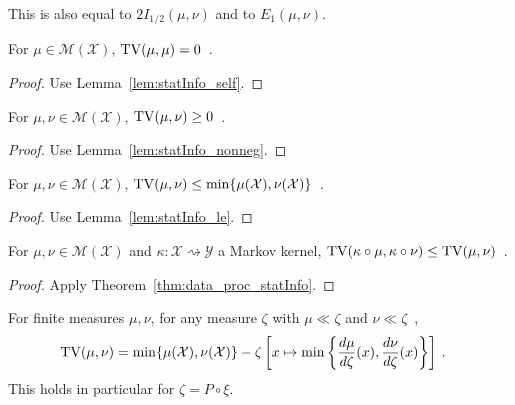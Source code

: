 This is also equal to $2 I_{1/2}(\mu, \nu)$ and to $E_1(\mu, \nu)$.

\begin{lemma}
  \label{lem:tv_self}
  For $\mu \in \mathcal M(\mathcal X)$, $\operatorname{TV}(\mu, \mu) = 0$~.
\end{lemma}

\begin{proof}%
{}
Use Lemma~\ref{lem:statInfo_self}.
\end{proof}

\begin{lemma}
  \label{lem:tv_nonneg}
  For $\mu, \nu \in \mathcal M(\mathcal X)$, $\operatorname{TV}(\mu, \nu) \ge 0$~.
\end{lemma}

\begin{proof}%
{}
Use Lemma~\ref{lem:statInfo_nonneg}.
\end{proof}


\begin{lemma}
  \label{lem:tv_le}
  For $\mu, \nu \in \mathcal M(\mathcal X)$, $\operatorname{TV}(\mu, \nu) \le \min\{\mu(\mathcal X), \nu(\mathcal X)\}$~.
\end{lemma}

\begin{proof}%
{}
Use Lemma~\ref{lem:statInfo_le}.
\end{proof}


\begin{theorem}
  \label{thm:tv_data_proc}
  For $\mu, \nu \in \mathcal M(\mathcal X)$ and $\kappa : \mathcal X \rightsquigarrow \mathcal Y$ a Markov kernel, $\operatorname{TV}(\kappa \circ \mu, \kappa \circ \nu) \le \operatorname{TV}(\mu, \nu)$~.
\end{theorem}

\begin{proof}%
{}
Apply Theorem~\ref{thm:data_proc_statInfo}.
\end{proof}


\begin{lemma}
  \label{lem:tv_eq_sub_min}
  For finite measures $\mu, \nu$, for any measure $\zeta$ with $\mu \ll \zeta$ and $\nu \ll \zeta$~,
  \begin{align*}
  \operatorname{TV}(\mu, \nu)
  &= \min\{\mu(\mathcal X), \nu(\mathcal X)\} - \zeta\left[x \mapsto \min \left\{\frac{d \mu}{d\zeta}(x), \frac{d \nu}{d\zeta}(x)\right\}\right]
  \: .
  \end{align*}
  This holds in particular for $\zeta = P \circ \xi$.
\end{lemma}

